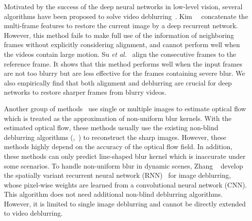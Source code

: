 \documentclass[10pt,twocolumn,letterpaper]{article}
\begin{document}
Motivated by the success of the deep neural networks in low-level vision, several algorithms have been proposed to solve video deblurring~\cite{hyun2017online,su2017deep}. 
Kim~\etal~\cite{hyun2017online} concatenate the multi-frame features to restore the current image by a deep recurrent network. However, this method fails to make full use of the information of neighboring frames without explicitly considering alignment,
and cannot perform well when the videos contain large motion.
Su \textit{et al.}~\cite{su2017deep} align the consecutive frames to the reference frame. 
It shows that this method performs well when the input frames are not too blurry but are less effective for the frames containing severe blur.
We also empirically find that both alignment and deblurring are crucial for deep networks to restore sharper frames from blurry videos.


Another group of methods~\cite{gong2017motion, sun2015learning, hyun2014segmentation, hyun2015generalized} use single or multiple images to estimate optical flow which is treated as the approximation of non-uniform blur kernels.
With the estimated optical flow, these methods usually use the existing non-blind deblurring algorithms (\eg,~\cite{zoran2011learning}) to reconstruct the sharp images.
However, these methods highly depend on the accuracy of the optical flow field.
In addition, these methods can only predict line-shaped blur kernel which is inaccurate under some scenarios.
To handle non-uniform blur in dynamic scenes, Zhang ~\cite{zhang2018dynamic} develop the spatially variant recurrent neural network (RNN)~\cite{liu2016learning} for image deblurring, whose pixel-wise weights are learned from a convolutional neural network (CNN). This algorithm does not need additional non-blind deblurring algorithms.
However, it is limited to single image deblurring and cannot be directly extended to video deblurring.
\end{document}
